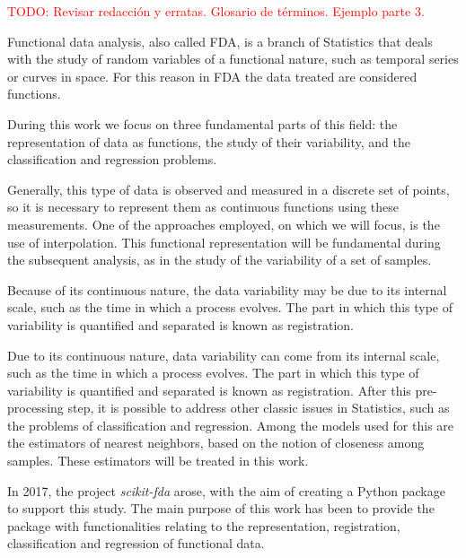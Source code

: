 \textcolor{red}{TODO: Revisar redacción y erratas. Glosario de términos. Ejemplo parte 3.}

Functional data analysis, also called FDA, is a branch of Statistics that deals
with the study of random variables of a functional nature, such as temporal
series or curves in space. For this reason in FDA the data treated are
considered functions.

During this work we focus on three fundamental parts of this field:
the representation of data as functions, the study of their variability,
and the classification and regression problems.

Generally, this type of data is observed and measured in a discrete set of
points, so it is necessary to represent them as continuous functions using
these measurements. One of the approaches employed, on which we will focus, is the
use of interpolation. This functional representation will be fundamental during
the subsequent analysis, as in the study of the variability of a set of samples.

Because of its continuous nature, the data variability may be due to its
internal scale, such as the time in which a process evolves.
The part in which this type of variability is quantified and separated is known
as registration.

Due to its continuous nature, data variability can come from its internal scale,
such as the time in which a process evolves. The part in which this
type of variability is quantified and separated is known as registration.
After this pre-processing step, it is possible to address other classic
issues in Statistics, such as the problems of classification and regression.
Among the models used for this are the estimators of nearest neighbors,
based on the notion of closeness among samples. These estimators
will be treated in this work.

In 2017, the project \textit{scikit-fda} arose, with the aim of creating a
Python package to support this study. The main purpose of this work has been to
provide the package with functionalities relating to the representation,
registration, classification and regression of functional data.

